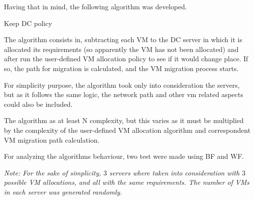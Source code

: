 \documentclass[12pt,english,oneside]{book}
\begin{document}
Having that in mind, the following algorithm was developed.\\

\begin{algorithm}[h!]
\caption{Keep DC policy}
\label{alg:keepdcpol}
\begin{algorithmic}[1]
\EndIf
\EndWhile
\end{algorithmic}
\end{algorithm}

The algorithm consists in, subtracting each VM to the DC server in which it is allocated its requirements (so apparently the VM has not been allocated) and after run the user-defined VM allocation policy to see if it would change place.
If so, the path for migration is calculated, and the VM migration process starts.

For simplicity purpose, the algorithm took only into consideration the servers, but as it follows the same logic, the network path and other vm related aspects could also be included.

The algorithm as at least N complexity, but this varies as it must be multiplied by the complexity of the user-defined VM allocation algorithm and correspondent VM migration path calculation.

\newpage

For analyzing the algorithms behaviour, two test were made using BF and WF.

\textit{Note: For the sake of simplicity, $3$ servers where taken into consideration with $3$ possible VM allocations, and all with the same requirements. The number of VMs in each server was generated randomly.}
\end{document}
